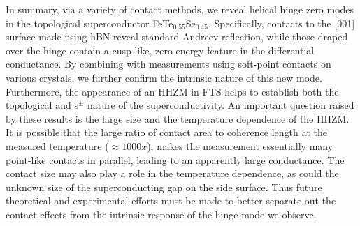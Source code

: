 In summary, via a variety of contact methods, we reveal helical hinge zero modes in the topological superconductor FeTe$_{0.55}$Se$_{0.45}$. Specifically,  contacts to the [001] surface made using hBN reveal standard Andreev reflection, while those draped over the hinge contain a cusp-like, zero-energy feature in the differential conductance. By combining with measurements using soft-point contacts on various crystals, we further confirm the intrinsic nature of this new mode. Furthermore, the appearance of an HHZM in FTS helps to establish both the topological and s$^{\pm}$ nature of the superconductivity. An important question raised by these results is the large size and the temperature dependence of the HHZM. It is possible that the large ratio of contact area to coherence length at the measured temperature ($\approx 1000x$), makes the measurement essentially many point-like contacts in parallel, leading to an apparently large conductance. The contact size may also play a role in the temperature dependence, as could the unknown size of the superconducting gap on the side surface. Thus future theoretical and experimental efforts must be made to better separate out the contact effects from the intrinsic response of the hinge mode we observe. 